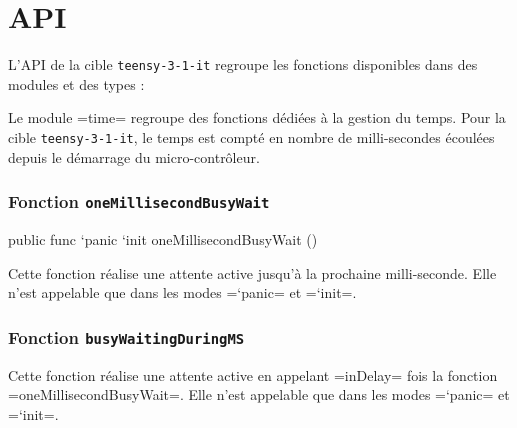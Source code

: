 \section{API}

L'API de la cible \texttt{teensy-3-1-it} regroupe les fonctions disponibles dans des modules et des types :


Le module \plm=time= regroupe des fonctions dédiées à la gestion du temps. Pour la cible \texttt{teensy-3-1-it}, le temps est compté en nombre de milli-secondes écoulées depuis le démarrage du micro-contrôleur. 

\subsubsection{Fonction \texttt{oneMillisecondBusyWait}}

\begin{PLM}
  public func `panic `init oneMillisecondBusyWait ()
\end{PLM}

Cette fonction réalise une attente active jusqu'à la prochaine milli-seconde. Elle n'est appelable que dans les modes \plm=`panic= et \plm=`init=. 





\subsubsection{Fonction \texttt{busyWaitingDuringMS}}


Cette fonction réalise une attente active en appelant \plm=inDelay= fois la fonction \plm=oneMillisecondBusyWait=. Elle n'est appelable que dans les modes \plm=`panic= et \plm=`init=. 





